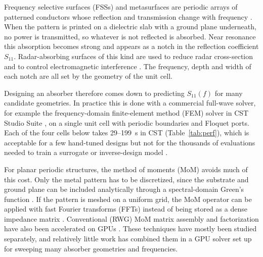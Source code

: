 \documentclass[10pt,conference]{IEEEtran}
\begin{document}
	Frequency selective surfaces (FSSs) and metasurfaces are periodic arrays of
	patterned conductors whose reflection and transmission change with
	frequency \cite{munk2000}. When the pattern is printed on a dielectric slab
	with a ground plane underneath, no power is transmitted, so whatever is not
	reflected is absorbed. Near resonance this absorption becomes strong and
	appears as a notch in the reflection coefficient $S_{11}$. Radar-absorbing
	surfaces of this kind are used to reduce radar cross-section and to control
	electromagnetic interference \cite{joy2021}. The frequency, depth and width of
	each notch are all set by the geometry of the unit cell.
	
	Designing an absorber therefore comes down to predicting $S_{11}(f)$ for many
	candidate geometries. In practice this is done with a commercial full-wave
	solver, for example the frequency-domain finite-element method (FEM) solver in
	CST Studio Suite \cite{cst}, on a single unit cell with periodic boundaries
	and Floquet ports. Each of the four cells below takes 29--199~s in CST
	(Table~\ref{tab:perf}), which is acceptable for a few hand-tuned designs but
	not for the thousands of evaluations needed to train a surrogate or
	inverse-design model \cite{liu2018,ma2018}.
	
	For planar periodic structures, the method of moments (MoM) \cite{harrington}
	avoids much of this cost. Only the metal pattern has to be discretized, since
	the substrate and ground plane can be included analytically through a
	spectral-domain Green's function \cite{itoh1980,mittra1988}. If the pattern is
	meshed on a uniform grid, the MoM operator can be applied with fast Fourier
	transforms (FFTs) instead of being stored as a dense impedance matrix
	\cite{cwik1987}. Conventional (RWG) MoM matrix assembly and factorization
	have also been accelerated on GPUs \cite{lezar2010}. These techniques have
	mostly been studied separately, and relatively little work has combined
	them in a GPU solver set up for sweeping many absorber geometries and
	frequencies.
	
\end{document}
